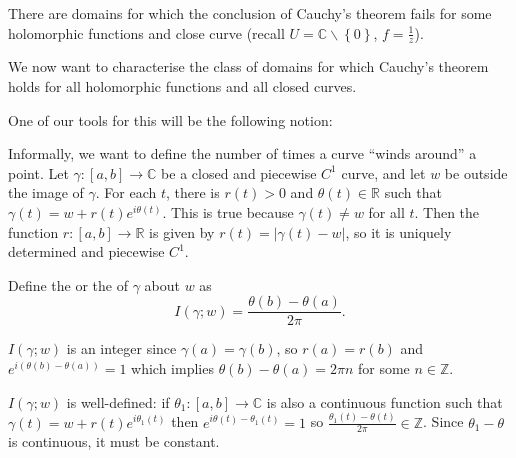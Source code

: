 \documentclass[egregdoesnotlikesansseriftitles,a4paper]{scrartcl}
\begin{document}
There are domains for which the conclusion of Cauchy's theorem fails for some holomorphic functions and close curve (recall $U= \mathbb{C}\backslash \left\{0\right\}$, $f=\frac{1}{z}$).
\begin{goal}
     We now want to characterise the class of domains for which Cauchy's theorem holds for all holomorphic functions and all closed curves.
\end{goal}
One of our tools for this will be the following notion:
\begin{definition*}
      Informally, we want to define the number of times a curve ``winds around'' a point. Let $\gamma: [a,b] \rightarrow \mathbb{C}$ be a closed and piecewise $C^{1}$ curve, and let $w$ be outside the image of $\gamma$. For each $t$, there is $r(t)>0$ and $\theta (t)\in \mathbb{R}$ such that $\gamma (t)=w + r (t) e^{i \theta (t)}$. This is true because $\gamma (t) \neq w$ for all $t$. Then the function $r: [a,b ] \rightarrow \mathbb{R}$ is given by $r (t)=\left|\gamma (t)-w\right|$, so it is uniquely determined and piecewise $C^{1}$.

      Define the  or the  of $\gamma$ about $w$ as \[
      I (\gamma; w)= \frac{\theta (b)-\theta (a)}{2\pi}
      .\]
      \begin{remark}
         $I (\gamma;w)$ is an integer since $\gamma (a)=\gamma (b)$, so $r (a)=r (b)$ and $e^{i (\theta (b)- \theta (a))}=1$ which implies $\theta (b)- \theta (a)=2 \pi n$ for some $n \in \mathbb{Z}$.   
      \end{remark}
      \begin{remark}
            $I (\gamma;w)$ is well-defined: if $\theta_1 : [a,b] \rightarrow \mathbb{C}$ is also a continuous function such that $\gamma (t)=w + r (t)e^{i \theta_1 (t)}$ then $e^{i \theta (t)-\theta_1 (t)}=1$ so $ \frac{\theta_1 (t)- \theta (t)}{2\pi} \in \mathbb{Z}$. Since $\theta_1 -\theta$ is continuous, it must be constant.
      \end{remark}
\end{definition*}
\end{document}
